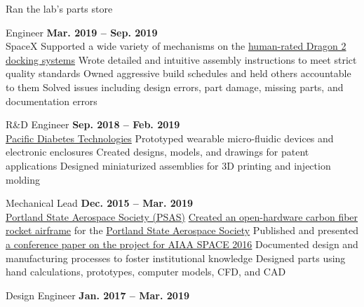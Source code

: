 \begin{innerlist}
		\subitem Ran the lab's parts store
	\item Engineer \hfill\textbf{Mar. 2019 -- Sep. 2019}
    \\ SpaceX 
		\subitem Supported a wide variety of mechanisms on the 
            \href{https://en.wikipedia.org/wiki/Dragon_2}{human-rated Dragon 2 docking systems}
		\subitem Wrote detailed and intuitive assembly instructions to meet strict quality standards
		\subitem Owned aggressive build schedules and held others accountable to them
		\subitem Solved issues including design errors, part damage, missing parts, and documentation errors
    \pagebreak
    \item R\&D Engineer \hfill\textbf{Sep. 2018 -- Feb. 2019} %
    \\ \href{http://pacificdt.com/}{Pacific Diabetes Technologies} 
        \subitem Prototyped wearable micro-fluidic devices and electronic enclosures
		\subitem Created designs, models, and drawings for patent applications
		\subitem Designed miniaturized assemblies for 3D printing and injection molding
	\item Mechanical Lead \hfill\textbf{Dec. 2015 -- Mar. 2019} 
    \\ \href{https://www.pdxaerospace.org/}{Portland State Aerospace Society (PSAS)}
		\subitem \href{https://github.com/psas/sw-cad-airframe-lv3.0}{Created 
			an open-hardware carbon fiber rocket airframe} for the 
			\href{http://psas.pdx.edu/}{Portland State Aerospace Society}
		\subitem Published and presented 
            \href{http://arc.aiaa.org/doi/pdf/10.2514/6.2016-5365}{a conference paper on the project for AIAA SPACE 2016}
		\subitem Documented design and manufacturing processes to foster institutional knowledge
		\subitem Designed parts using hand calculations, prototypes, computer models, CFD, and CAD
	\item Design Engineer \hfill\textbf{Jan. 2017 -- Mar. 2019}

\end{innerlist}
